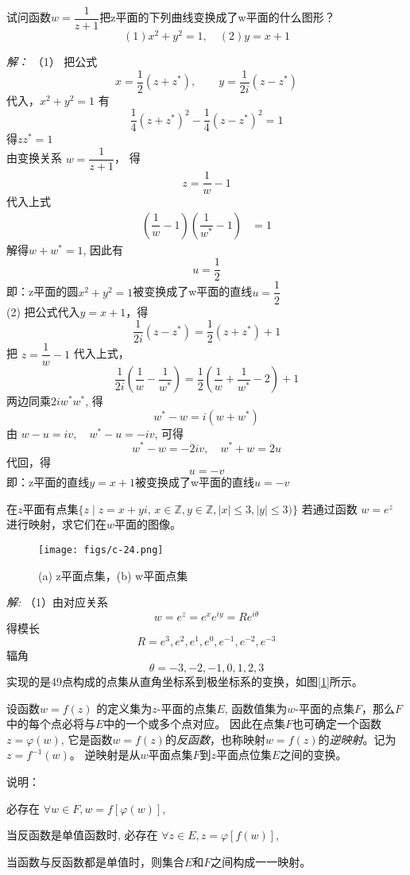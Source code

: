 \begin{example}
    试问函数$w = \dfrac{1}{z+1}$把z平面的下列曲线变换成了w平面的什么图形？
    \[ (1) x^2 + y^2 =1, \quad (2) y=x+1\]
\end{example}
\emph{解：} （1） 把公式 
\[ x= \frac{1}{2}(z + z^*), \qquad  y= \frac{1}{2i}(z - z^*) \]
代入，$x^2 + y^2 = 1$  有
\[ \frac{1}{4}(z + z^*)^2 - \frac{1}{4}(z - z^*)^2 =1\]
得$zz^* =1$\\
由变换关系 $w = \dfrac{1}{z+1}$， 得
\[ z=  \dfrac{1}{w} -1\]
代入上式
\[ \begin{aligned}
    (\dfrac{1}{w} -1)(\dfrac{1}{w^*} -1) &= 1
\end{aligned} \]
解得$w + w^* =1$, 因此有 
\[ u= \dfrac{1}{2}\]
即：z平面的圆$ x^2 + y^2 =1$被变换成了w平面的直线$u= \dfrac{1}{2}$ \\
(2) 把公式代入$y=x+1$，得
\[ \frac{1}{2i}(z - z^*) = \frac{1}{2}(z + z^*) +1 \]
把 $z=  \dfrac{1}{w} -1$ 代入上式，
\[ \frac{1}{2i} \left( \frac{1}{w} -  \frac{1}{w^*} \right)  =  \frac{1}{2} \left( \frac{1}{w} + \frac{1}{w^*} -2\right) +1 \]
两边同乘$2iw^* w^*$, 得
\[ w^* - w = i(w + w^*)\]
由 $ w -u = iv, \quad  w^*-u = - iv $, 可得
\[ w^* - w = -2 i v, \quad w^* + w = 2 u\]
代回，得 
\[ u = -v \]
即：z平面的直线$y=x+1$被变换成了w平面的直线$u= -v $ \\

\begin{example}
    在$z$平面有点集$\{ z \mid z = x+yi, \, x \in \mathbb{Z}, y \in \mathbb{Z}, \left\vert x \right\vert \le 3, \left\vert y \right\vert \le 3) \}$ 
    若通过函数 $w= e^z $ 进行映射，求它们在$w$平面的图像。
    \begin{figure}[htbp]
        \centering
        \texttt{[image: figs/c-24.png]}
        \caption{(a) z平面点集，(b) w平面点集}
        \label{fig:twoplantdots}
       \end{figure}
\end{example}
\emph{解:} （1）由对应关系 
\[ w= e^z = e^xe^{iy} =Re^{i\theta}\]
得模长
\[ R= e^3, e^2, e^1, e^0, e^{-1}, e^{-2}, e^{-3}\]
辐角
\[ \theta = -3, -2, -1, 0, 1, 2, 3\]
实现的是49点构成的点集从直角坐标系到极坐标系的变换，如图[\ref{fig:twoplantdots}]所示。\\

\begin{definition}\label{}\index{}
	设函数$w = f(z)$ 的定义集为$z$-平面的点集$E$, 函数值集为$w$-平面的点集$F$，那么$F$中的每个点必将与$E$中的一个或多个点对应。 因此在点集$F$也可确定一个函数$z= \varphi(w)$, 它是函数$w = f(z)$的\emph{反函数}，也称映射$w = f(z)$的\emph{逆映射}。记为$z= f^{-1}(w)$。 逆映射是从$w$平面点集$F$到$z$平面点位集$E$之间的变换。
\end{definition}
说明：\begin{compactitem}
    \item 必存在 $\forall w \in F, w = f[\varphi(w)]$,
    \item 当反函数是单值函数时, 必存在 $\forall z \in E, z = \varphi [f(w)]$,
    \item 当函数与反函数都是单值时，则集合$E$和$F$之间构成一一映射。
\end{compactitem} 
~\\

